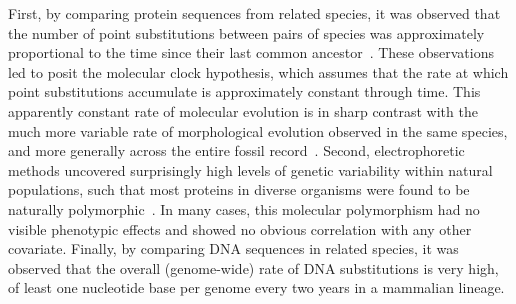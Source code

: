 First, by comparing protein sequences from related species, it was observed that the number of point substitutions between pairs of species was approximately proportional to the time since their last common ancestor~\citep{Zuckerkandl1965,Salser1976}.
These observations led to posit the molecular clock hypothesis, which assumes that the rate at which point substitutions accumulate is approximately constant through time.
This apparently constant rate of molecular evolution is in sharp contrast with the much more variable rate of morphological evolution observed in the same species, and more generally across the entire fossil record~\citep{Simpson1944,Simpson1953}.
Second, electrophoretic methods uncovered surprisingly high levels of genetic variability within natural populations, such that most proteins in diverse organisms were found to be naturally polymorphic~\citep{Harris1966, Hubby1966, Lewontin1966}.
In many cases, this molecular polymorphism had no visible phenotypic effects and showed no obvious correlation with any other covariate.
Finally, by comparing DNA sequences in related species, it was observed that the overall (genome-wide) rate of DNA substitutions is very high, of least one nucleotide base per genome every two years in a mammalian lineage.

